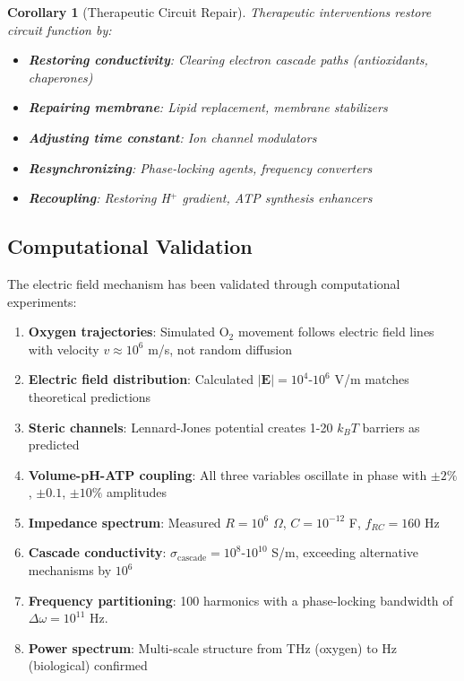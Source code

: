 \documentclass[11pt,twocolumn,a4paper]{article}
\newtheorem{corollary}[theorem]{Corollary}
\theoremstyle{definition}
\theoremstyle{remark}
\begin{document}
\begin{corollary}[Therapeutic Circuit Repair]
\label{cor:therapeutic_circuit}
Therapeutic interventions restore circuit function by:
\begin{itemize}
  \item \textbf{Restoring conductivity}: Clearing electron cascade paths (antioxidants, chaperones)
  \item \textbf{Repairing membrane}: Lipid replacement, membrane stabilizers
  \item \textbf{Adjusting time constant}: Ion channel modulators
  \item \textbf{Resynchronizing}: Phase-locking agents, frequency converters
  \item \textbf{Recoupling}: Restoring H$^+$ gradient, ATP synthesis enhancers
\end{itemize}
\end{corollary}

\subsection{Computational Validation}

The electric field mechanism has been validated through computational experiments:

\begin{enumerate}
  \item \textbf{Oxygen trajectories}: Simulated O$_2$ movement follows electric field lines with velocity $v \approx 10^6$ m/s, not random diffusion
  \item \textbf{Electric field distribution}: Calculated $|\mathbf{E}| = 10^4$-$10^6$ V/m matches theoretical predictions
  \item \textbf{Steric channels}: Lennard-Jones potential creates 1-20 $k_B T$ barriers as predicted
  \item \textbf{Volume-pH-ATP coupling}: All three variables oscillate in phase with $\pm 2\%$, $\pm 0.1$, $\pm 10\%$ amplitudes
  \item \textbf{Impedance spectrum}: Measured $R = 10^6$ $\Omega$, $C = 10^{-12}$ F, $f_{RC} = 160$ Hz
  \item \textbf{Cascade conductivity}: $\sigma_{\mathrm{cascade}} = 10^{8}$-$10^{10}$ S/m, exceeding alternative mechanisms by $10^6$
  \item \textbf{Frequency partitioning}: 100 harmonics with a phase-locking bandwidth of $\Delta\omega = 10^{11}$ Hz.
  \item \textbf{Power spectrum}: Multi-scale structure from THz (oxygen) to Hz (biological) confirmed
\end{enumerate}
\end{document}
